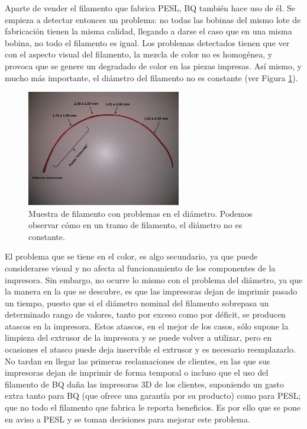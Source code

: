 Aparte de vender el filamento que fabrica PESL, BQ también hace uso de él. Se empieza a detectar entonces un problema: no todas las bobinas del mismo lote de fabricación tienen la misma calidad, llegando a darse el caso que en una misma bobina, no todo el filamento es igual. Los problemas detectados tienen que ver con el aspecto visual del filamento, la mezcla de color no es homogénea, y provoca que se genere un degradado de color en las piezas impresas. Así mismo, y mucho más importante, el diámetro del filamento no es constante (ver Figura \ref{fig:muestra_filamento}).

\begin{figure}[!ht]
    \centering
    \includegraphics[width=0.6\textwidth]{images/atasco_rojo.jpg}
    \caption[Muestra de filamento con problemas en el diámetro]{Muestra de filamento con problemas en el diámetro. Podemos observar cómo en un tramo de filamento, el diámetro no es constante.}
    \label{fig:muestra_filamento}
\end{figure}

El problema que se tiene en el color, es algo secundario, ya que puede considerarse visual y no afecta al funcionamiento de los componentes de la impresora. Sin embargo, no ocurre lo mismo con el problema del diámetro, ya que la manera en la que se descubre, es que las impresoras dejan de imprimir pasado un tiempo, puesto que si el diámetro nominal del filamento sobrepasa un determinado rango de valores, tanto por exceso como por déficit, se producen atascos en la impresora. Estos atascos, en el mejor de los casos, sólo supone la limpieza del extrusor de la impresora y se puede volver a utilizar, pero en ocasiones el atasco puede deja inservible el extrusor y es necesario reemplazarlo.\\

No tardan en llegar las primeras reclamaciones de clientes, en las que sus impresoras dejan de imprimir de forma temporal o incluso que el uso del filamento de BQ daña las impresoras 3D de los clientes, suponiendo un gasto extra tanto para BQ (que ofrece una garantía por su producto) como para PESL; que no todo el filamento que fabrica le reporta beneficios. Es por ello que se pone en aviso a PESL y se toman decisiones para mejorar este problema.\\

